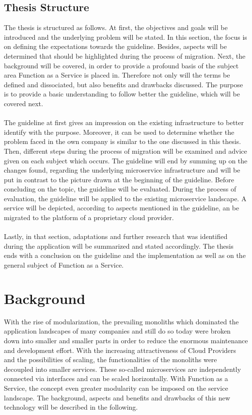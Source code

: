 \documentclass[a4paper,11pt, pagesize]{scrartcl}
\begin{document}
\begin{spacing}{1.2}
\subsection{Thesis Structure}
The thesis is structured as follows. At first, the objectives and goals will be introduced and the underlying problem will be stated. In this section, the focus is on defining the expectations towards the guideline. Besides, aspects will be determined that should be highlighted during the process of migration. Next, the background will be covered, in order to provide a profound basis of the subject area Function as a Service is placed in. Therefore not only will the terms be defined and dissociated, but also benefits and drawbacks discussed. The purpose is to provide a basic understanding to follow better the guideline, which will be covered next.\\\\ The guideline at first gives an impression on the existing infrastructure to better identify with the purpose. Moreover, it can be used to determine whether the problem faced in the own company is similar to the one discussed in this thesis. Then, different steps during the process of migration will be examined and advice given on each subject which occurs. The guideline will end by summing up on the changes found, regarding the underlying microservice infrastructure and will be put in contrast to the picture drawn at the beginning of the guideline. Before concluding on the topic, the guideline will be evaluated. During the process of evaluation, the guideline will be applied to the existing microservice landscape. A service will be depicted, according to aspects mentioned in the guideline, an be migrated to the platform of a proprietary cloud provider.\\\\ Lastly, in that section, adaptations and further research that was identified during the application will be summarized and stated accordingly. The thesis ends with a conclusion on the guideline and the implementation as well as on the general subject of Function as a Service.
\newpage
\section{Background}
With the rise of modularization, the prevailing monoliths which dominated the application landscapes of many companies and still do so today were broken down into smaller and smaller parts in order to reduce the enormous maintenance and development effort. With the increasing attractiveness of Cloud Providers and the possibilities of scaling, the functionalities of the monoliths were decoupled into smaller services. These so-called microservices are independently connected via interfaces and can be scaled horizontally. With Function as a Service, the concept even greater modularity can be imposed on the service landscape. The background, aspects and benefits and drawbacks of this new technology will be described in the following.

\end{spacing}
\end{document}
